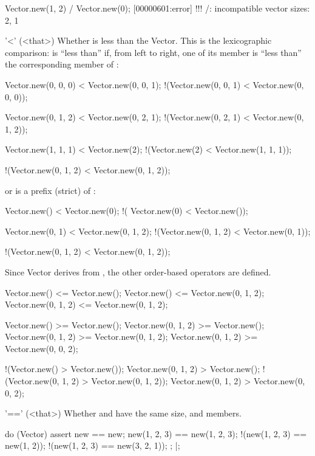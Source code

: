 \begin{urbiscriptapi}
\begin{urbiassert}
Vector.new(1, 2) / Vector.new(0);
[00000601:error] !!! /: incompatible vector sizes: 2, 1
\end{urbiassert}


\item['<'](<that>)%
  Whether \this is less than the \that Vector.  This is the lexicographic
  comparison: \this is ``less than'' \that if, from left to right, one of
  its member is ``less than'' the corresponding member of \that:

\begin{urbiassert}
   Vector.new(0, 0, 0) < Vector.new(0, 0, 1);
 !(Vector.new(0, 0, 1) < Vector.new(0, 0, 0));

   Vector.new(0, 1, 2) < Vector.new(0, 2, 1);
 !(Vector.new(0, 2, 1) < Vector.new(0, 1, 2));

   Vector.new(1, 1, 1) < Vector.new(2);
 !(Vector.new(2)       < Vector.new(1, 1, 1));

 !(Vector.new(0, 1, 2) < Vector.new(0, 1, 2));
\end{urbiassert}

  \noindent
  or \that is a prefix (strict) of \this:

\begin{urbiassert}
           Vector.new() < Vector.new(0);
  !(      Vector.new(0) < Vector.new());

       Vector.new(0, 1) < Vector.new(0, 1, 2);
  !(Vector.new(0, 1, 2) < Vector.new(0, 1));

  !(Vector.new(0, 1, 2) < Vector.new(0, 1, 2));
\end{urbiassert}

Since Vector derives from , the other order-based
operators are defined.

\begin{urbiassert}
        Vector.new() <= Vector.new();
        Vector.new() <= Vector.new(0, 1, 2);
 Vector.new(0, 1, 2) <= Vector.new(0, 1, 2);

        Vector.new() >= Vector.new();
 Vector.new(0, 1, 2) >= Vector.new();
 Vector.new(0, 1, 2) >= Vector.new(0, 1, 2);
 Vector.new(0, 1, 2) >= Vector.new(0, 0, 2);

       !(Vector.new() > Vector.new());
  Vector.new(0, 1, 2) > Vector.new();
!(Vector.new(0, 1, 2) > Vector.new(0, 1, 2));
  Vector.new(0, 1, 2) > Vector.new(0, 0, 2);
\end{urbiassert}


\item['=='](<that>)%
  Whether \this and \that have the same size, and members.
\begin{urbiscript}
do (Vector)
{
  assert
  {
               new == new;
      new(1, 2, 3) == new(1, 2, 3);
    !(new(1, 2, 3) == new(1, 2));
    !(new(1, 2, 3) == new(3, 2, 1));
  };
}|;
\end{urbiscript}



\end{urbiscriptapi}

